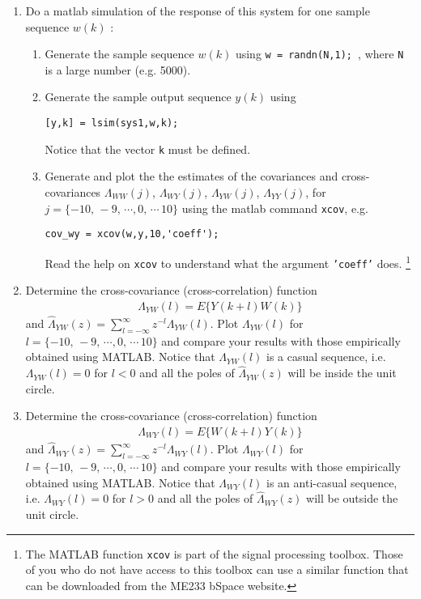 \begin{enumerate}

\item
Do a matlab simulation of the response of this system for one sample sequence $w(k)$ :

\begin{enumerate}
    \item
    Generate the sample sequence $w(k)$ using {\tt w = randn(N,1); }, where {\tt N} is a large number (e.g. 5000).

    \item
    Generate the sample output sequence $y(k)$ using

    \begin{center}
        \verb|[y,k] = lsim(sys1,w,k);|
    \end{center}
    Notice that the vector {\tt k} must be defined.

    \item
    Generate and plot the the estimates of the covariances and cross-covariances $\Lambda_{WW}(j)$, $\Lambda_{WY}(j)$,  $\Lambda_{YW}(j)$, $\Lambda_{YY}(j)$, for $j = \{-10,\, -9,\, \cdots ,0,\, \cdots \,10\}$ using the matlab command {\tt xcov}, e.g.\

    \begin{center}
        \verb|cov_wy = xcov(w,y,10,'coeff');|
    \end{center}
    Read the help on  {\tt xcov}  to understand what the argument {\tt 'coeff'} does.
    \footnote{The MATLAB function {\tt xcov} is part of the signal processing toolbox. Those of you who do not have access to this toolbox can use a similar function that can be downloaded from the ME233 bSpace website.}
\end{enumerate}

\item
Determine the cross-covariance (cross-correlation) function
\begin{align*}
    \Lambda_{YW}(l) = E\{Y(k+l)W(k)\}
\end{align*}
and $\hat{\Lambda}_{YW}(z) = \sum_{l=-\infty}^{\infty} z^{-l} \Lambda_{YW}(l)$. Plot $\Lambda_{YW}(l)$ for $l = \{-10,\, -9,\, \cdots ,0,\, \cdots \,10\}$ and compare your results with those empirically obtained using MATLAB. Notice that $\Lambda_{YW}(l)$ is a casual sequence, i.e. $\Lambda_{YW}(l) = 0$ for $ l < 0$ and all the poles of $\hat{\Lambda}_{YW}(z)$ will be inside the unit circle.

\item
Determine the cross-covariance (cross-correlation) function
\begin{align*}
    \Lambda_{WY}(l) = E\{W(k+l)Y(k)\}
\end{align*}
and $\hat{\Lambda}_{WY}(z) = \sum_{l=-\infty}^{\infty} z^{-l} \Lambda_{WY}(l)$. Plot $\Lambda_{WY}(l)$ for $l = \{-10,\, -9,\, \cdots ,0,\, \cdots \,10\}$ and compare your results with those empirically obtained using MATLAB. Notice that $\Lambda_{WY}(l)$ is an anti-casual sequence, i.e. $\Lambda_{WY}(l) = 0$ for $ l > 0$ and all the poles of $\hat{\Lambda}_{WY}(z)$ will be outside the unit circle.


\end{enumerate}
